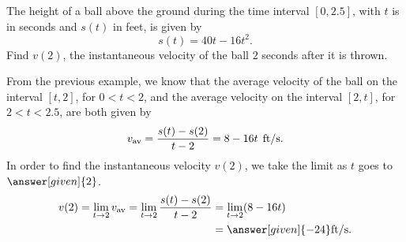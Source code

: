 \documentclass{ximera}
\begin{document}
\begin{example}
The height of a ball above the ground during the time interval  $[0,2.5]$, with $t$ is in seconds and $s(t)$ in feet, 
is given by
\[
s(t) = 40t - 16t^2.
\] 
Find $v(2)$, the instantaneous velocity of the ball $2$ seconds after it
is thrown.

\begin{explanation}
From the previous example, we know that the average velocity of the
ball on the interval $[t,2]$, for $0<t<2$, and the average velocity
on the interval $[2,t]$, for $2<t<2.5$, are both given by
\[
v_{\text{av}} =  \frac{s(t)-s(2)}{t-2}= 8-16t \hspace{0.06in}\text{ft/s}.
\]
In order to find the instantaneous velocity $v(2)$, we 
take the limit as $t$ goes to $\answer[given]{2}$. 
\begin{align*}
v (2)= \lim_{t\to2}v_{\text{av}}
=\lim_{t\to2}  \frac{s(t)-s(2)}{t-2}
&= \lim_{t\to2}(8-16t)\\
&= \answer[given]{-24}\text{ft/s}.
\end{align*}
\end{explanation}
\end{example}
\end{document}
